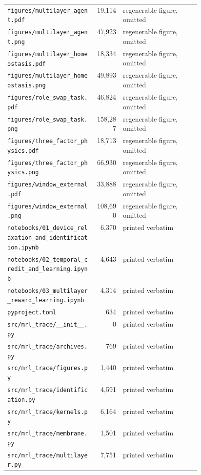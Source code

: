 \documentclass[a4paper,10pt]{article}
\begin{document}
\begin{longtable}{@{}p{0.46\linewidth} r l@{}}
\texttt{\scriptsize figures/multilayer\_agent.pdf} & 19,114 & regenerable figure, omitted \\
\texttt{\scriptsize figures/multilayer\_agent.png} & 47,923 & regenerable figure, omitted \\
\texttt{\scriptsize figures/multilayer\_homeostasis.pdf} & 18,334 & regenerable figure, omitted \\
\texttt{\scriptsize figures/multilayer\_homeostasis.png} & 49,893 & regenerable figure, omitted \\
\texttt{\scriptsize figures/role\_swap\_task.pdf} & 46,824 & regenerable figure, omitted \\
\texttt{\scriptsize figures/role\_swap\_task.png} & 158,287 & regenerable figure, omitted \\
\texttt{\scriptsize figures/three\_factor\_physics.pdf} & 18,713 & regenerable figure, omitted \\
\texttt{\scriptsize figures/three\_factor\_physics.png} & 66,930 & regenerable figure, omitted \\
\texttt{\scriptsize figures/window\_external.pdf} & 33,888 & regenerable figure, omitted \\
\texttt{\scriptsize figures/window\_external.png} & 108,690 & regenerable figure, omitted \\
\texttt{\scriptsize notebooks/01\_device\_relaxation\_and\_identification.ipynb} & 6,370 & printed verbatim \\
\texttt{\scriptsize notebooks/02\_temporal\_credit\_and\_learning.ipynb} & 4,643 & printed verbatim \\
\texttt{\scriptsize notebooks/03\_multilayer\_reward\_learning.ipynb} & 4,314 & printed verbatim \\
\texttt{\scriptsize pyproject.toml} & 634 & printed verbatim \\
\texttt{\scriptsize src/mrl\_trace/\_\_init\_\_.py} & 0 & printed verbatim \\
\texttt{\scriptsize src/mrl\_trace/archives.py} & 769 & printed verbatim \\
\texttt{\scriptsize src/mrl\_trace/figures.py} & 1,440 & printed verbatim \\
\texttt{\scriptsize src/mrl\_trace/identification.py} & 4,591 & printed verbatim \\
\texttt{\scriptsize src/mrl\_trace/kernels.py} & 6,164 & printed verbatim \\
\texttt{\scriptsize src/mrl\_trace/membrane.py} & 1,501 & printed verbatim \\
\texttt{\scriptsize src/mrl\_trace/multilayer.py} & 7,751 & printed verbatim \\

\end{longtable}
\end{document}
